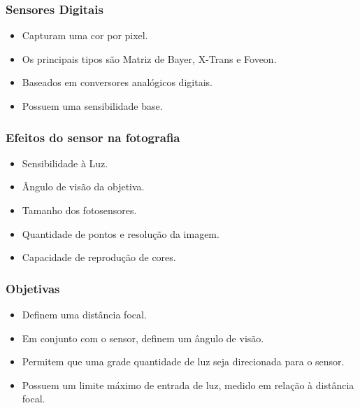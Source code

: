 


\begin{frame}
        \frametitle{Sensores Digitais}

        \begin{itemize}
            \item Capturam uma cor por pixel.
            \item Os principais tipos são Matriz de Bayer, X-Trans e Foveon.
            \item Baseados em conversores analógicos digitais.
            \item Possuem uma sensibilidade base.
        \end{itemize}
\end{frame}

\begin{frame}
    \frametitle{Efeitos do sensor na fotografia}

    \begin{itemize}
        \item Sensibilidade à Luz.
        \item Ângulo de visão da objetiva.
        \item Tamanho dos fotosensores.
        \item Quantidade de pontos e resolução da imagem.
        \item Capacidade de reprodução de cores.
    \end{itemize}
\end{frame}

\begin{frame}
    \frametitle{Objetivas}
    \begin{itemize}
        \item Definem uma distância focal.
        \item Em conjunto com o sensor, definem um ângulo de visão.
        \item Permitem que uma grade quantidade de luz seja direcionada para o sensor.
        \item Possuem um limite máximo de entrada de luz, medido em relação à distância focal.
    \end{itemize}
\end{frame}

